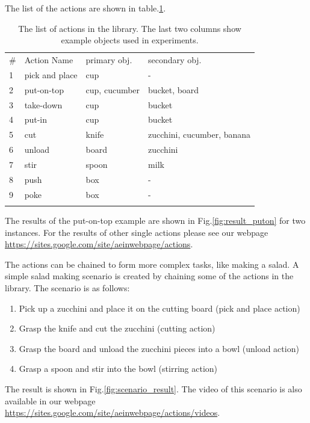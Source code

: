 The list of the actions are shown in table.\ref{tab:action_list}.
\begin{table}
\caption{The list of actions in the library. The last two columns show example objects used in experiments.}
\label{tab:action_list}       %
\begin{tabular}{llll}
\hline\noalign{\smallskip}
\# & Action Name & primary obj. & secondary obj. \\
\noalign{\smallskip}\hline\noalign{\smallskip}
1 & pick and place  & cup & - \\
2 & put-on-top & cup, cucumber & bucket, board \\ 
3 & take-down  & cup & bucket \\
4 & put-in  & cup & bucket \\
5 & cut  & knife & zucchini, cucumber, banana \\
6 & unload  & board & zucchini \\
7 & stir  & spoon & milk \\
8 & push  & box & - \\
9 & poke  & box & -\\
\noalign{\smallskip}\hline
\end{tabular}
\end{table}

The results of the put-on-top example are shown in Fig.\ref{fig:result_puton} for two instances.
For the results of other single actions please see our webpage \url{https://sites.google.com/site/aeinwebpage/actions}.

The actions can be chained to form more complex tasks, like making a salad.
A simple salad making scenario is created by chaining some of the actions in the library.
The scenario is as follows:
\begin{enumerate}
 \item Pick up a zucchini and place it on the cutting board (pick and place action)
 \item Grasp the knife and cut the zucchini (cutting action)
 \item Grasp the board and unload the zucchini pieces into a bowl (unload action)
 \item Grasp a spoon and stir into the bowl (stirring action)
\end{enumerate}

The result is shown in Fig.\ref{fig:scenario_result}.
The video of this scenario is also available in our webpage \url{https://sites.google.com/site/aeinwebpage/actions/videos}.












